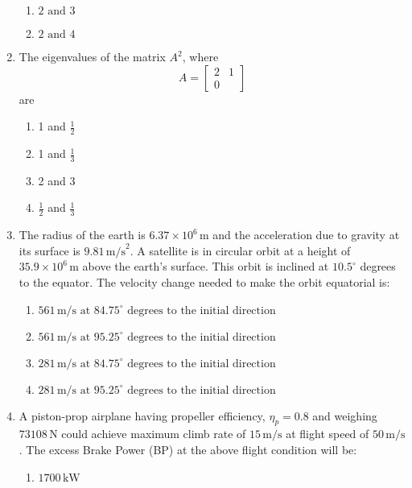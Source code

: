 \documentclass[journal]{IEEEtran}
\numberwithin{equation}{enumi}
\numberwithin{figure}{enumi}
\begin{document}
\begin{enumerate}
\begin{multicols}{4}
\begin{enumerate}
        \item $ \text{2 and 3} $
        \item $ \text{2 and 4} $
    \end{enumerate}
\end{multicols}
\bigskip
\item The eigenvalues of the matrix $A^2$, where \[A = \begin{bmatrix} 2 & 1 \\0 &\end{bmatrix}\]
are
\begin{multicols}{2}
    \begin{enumerate}
        \item 1 and $\frac{1}{2}$
        \item 1 and $\frac{1}{3}$
        \item 2 and 3
        \item $\frac{1}{2}$ and $\frac{1}{3}$
    \end{enumerate}
\end{multicols}
\bigskip
\item The radius of the earth is $6.37 \times 10^6 \, \text{m}$ and the acceleration due to gravity at its surface is $9.81 \, \text{m/s}^2$. A satellite is in circular orbit at a height of $35.9 \times 10^6 \, \text{m}$ above the earth's surface. This orbit is inclined at $10.5^\circ$ degrees to the equator. The velocity change needed to make the orbit equatorial is:
    \begin{enumerate}
        \item $561 \, \text{m/s at } 84.75^\circ \text{ degrees to the initial direction}$
        \item $561 \, \text{m/s at } 95.25^\circ \text{ degrees to the initial direction}$
        \item $281 \, \text{m/s at } 84.75^\circ \text{ degrees to the initial direction}$
        \item $281 \, \text{m/s at } 95.25^\circ \text{ degrees to the initial direction}$
    \end{enumerate}
\bigskip
\item A piston-prop airplane having propeller efficiency, $\eta_p = 0.8$ and weighing $73108 \, \text{N}$ could achieve maximum climb rate of $15 \, \text{m/s}$ at flight speed of $50 \, \text{m/s}$. The excess Brake Power (BP) at the above flight condition will be:
\begin{multicols}{2}
    \begin{enumerate}
        \item $1700 \, \text{kW}$

\end{enumerate}
\end{multicols}
\end{enumerate}
\end{document}
